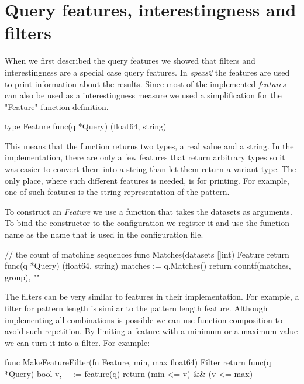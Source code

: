 \section{Query features, interestingness and filters}

When we first described the query features we showed that filters and interestingness are a special case query features. In \emph{spexs2} the features are used to print information about the results. Since most of the implemented \emph{features} can also be used as a interestingness measure we used a simplification for the "Feature" function definition.

\begin{file}
type Feature func(q *Query) (float64, string)
\end{file}

This means that the function returns two types, a real value and a string. In the implementation, there are only a few features that return arbitrary types so it was easier to convert them into a string than let them return a variant type. The only place, where such different features is needed, is for printing. For example, one of such features is the string representation of the pattern.

To construct an \emph{Feature} we use a function that takes the datasets as arguments. To bind the constructor to the configuration we register it and use the function name as the name that is used in the configuration file.

\begin{file}
// the count of matching sequences
func Matches(datasets []int) Feature {
    return func(q *Query) (float64, string) {
        matches := q.Matches()
        return countf(matches, group), ""
    }
}    
\end{file}

The filters can be very similar to features in their implementation. For example, a filter for pattern length is similar to the pattern length feature. Although implementing all combinations is possible we can use function composition to avoid such repetition. By limiting a feature with a minimum or a maximum value we can turn it into a filter. For example:

\begin{file}
func MakeFeatureFilter(fn Feature, min, max float64) Filter {
    return func(q *Query) bool {
        v, _ := feature(q)
        return (min <= v) && (v <= max)
    }
}
\end{file}

